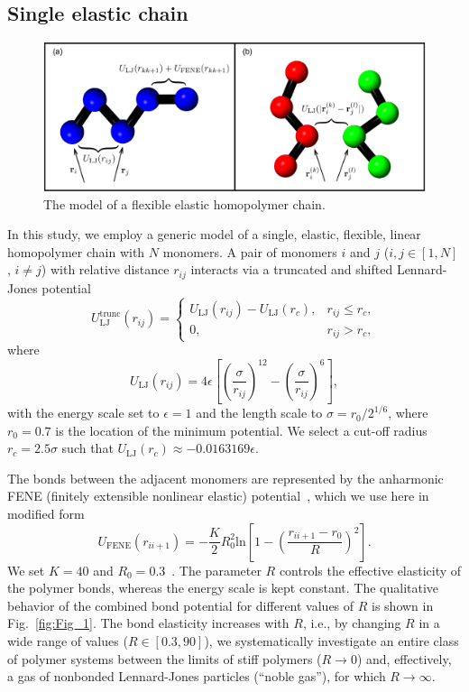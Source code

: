 \documentclass[12pt]{report}
\begin{document}
\subsection{Single elastic chain}
%
\begin{figure}
\center
\includegraphics[width = 1.01\textwidth]{chapter4Figs/polymerModel.pdf}
\caption{\label{fig:singleChain}%
The model of a flexible elastic homopolymer chain.
}
\end{figure}
% 

In this study, we employ a generic model of a single, elastic, flexible,
linear
homopolymer chain with $N$ monomers. A pair of monomers $i$ and $j$
($i,j\in [1,N]$, $i\neq j$) with relative distance $r_{ij}$ interacts
via a
truncated and shifted Lennard-Jones potential
\begin{equation}
U_{\mathrm{LJ}}^{\mathrm{trunc}}(r_{ij}) =  \begin{cases}
U_{\mathrm{LJ}}(r_{ij}) -  U_{\mathrm{LJ}}(r_{c}), &
r_{ij} \leq r_{c},\\
0, &   r_{ij} > r_{c}, \end{cases}
\end{equation}
where
\begin{equation}
U_{\mathrm{LJ}}(r_{ij})= 4\epsilon \left[ \left(
\frac{\sigma}{r_{ij}} \right)^{12} - 			\left(
\frac{\sigma}{r_{ij}} \right)^{6} \right], 
\label{LJ2}
\end{equation}
with the energy scale set to $\epsilon=1$ and the length scale to 
$\sigma=r_0/2^{1/6}$, where $r_0 = 0.7$ is the location of the minimum
potential. We select a cut-off radius $r_c=2.5\sigma$ such that
$U_{\mathrm{LJ}}(r_{c}) \approx -0.0163169\epsilon$.

The bonds between the adjacent monomers are represented by the
anharmonic FENE (finitely extensible nonlinear elastic) 
potential~\cite{BiCuArHa1987,FENE3,MilBhaBin2001}, which we use here in
modified
form
\begin{equation}
U_{\mathrm{FENE}}(r_{ii+1})=-\frac{K}{2}R_{0}^2 
\mathrm{ln}\left[1-\left(\frac{r_{ii+1}-r_0}{R}\right)^2\right]. 
\label{FENE}
\end{equation}
We set $K=40$ and $R_{0}=0.3$~\cite{Gross2013}. 
The parameter $R$ controls the effective elasticity of the polymer bonds,
whereas the energy scale is kept constant. The qualitative behavior of the
combined bond potential for different values of $R$ is shown in
Fig.~\ref{fig:Fig_1}. The bond elasticity increases with $R$,
i.e., by changing $R$ in a wide range of values
($R\in[0.3,90]$), we systematically investigate an
entire class of polymer systems between the limits of stiff polymers
($R\to 0$) and, effectively, a gas of nonbonded Lennard-Jones particles
(``noble gas''), for which $R\to \infty$.  
\end{document}
